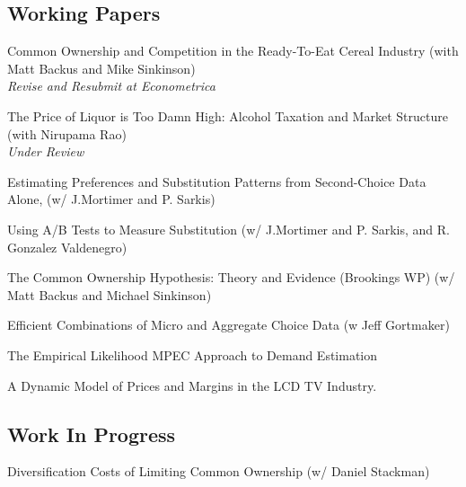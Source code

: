 \documentclass[letterpaper]{article}
\renewenvironment{itemize}{
  \begin{list}{}{
    \setlength{\leftmargin}{1.5em}
  }
}{
  \end{list}
}
\begin{document}
\subsection*{Working Papers}
\begin{itemize}
\item 
\item Common Ownership and Competition in the Ready-To-Eat Cereal Industry (with Matt Backus and Mike Sinkinson)  \\\textit{Revise and Resubmit at Econometrica} 
\item The Price of Liquor is Too Damn High: Alcohol Taxation and Market Structure (with Nirupama Rao)  \\\textit{Under Review} 
\item Estimating Preferences and Substitution Patterns from Second-Choice Data Alone, (w/ J.Mortimer and P. Sarkis) 
\item Using A/B Tests to Measure Substitution (w/ J.Mortimer and P. Sarkis, and R. Gonzalez Valdenegro) 
\item The Common Ownership Hypothesis: Theory and Evidence (Brookings WP) (w/ Matt Backus and Michael Sinkinson) 
\item Efficient Combinations of Micro and Aggregate Choice Data (w Jeff Gortmaker)
\item The Empirical Likelihood MPEC Approach to Demand Estimation\\ %
\item A Dynamic Model of Prices and Margins in the LCD TV Industry. 
\end{itemize}

\subsection*{Work In Progress}
\begin{itemize}
\item Diversification Costs of Limiting Common Ownership (w/ Daniel Stackman)
\end{itemize}
\end{document}
